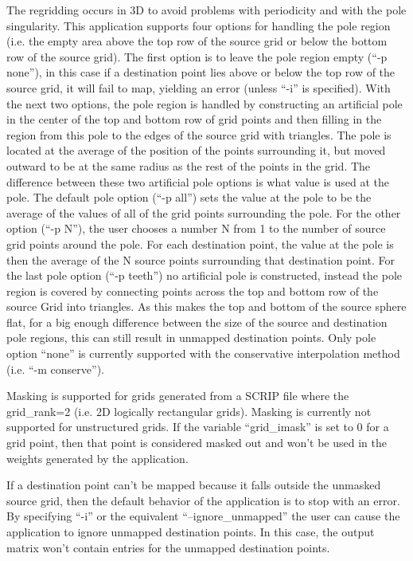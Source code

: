 The regridding occurs in 3D to avoid
problems with periodicity and with the pole singularity. This application
supports four options for handling the pole region (i.e. the empty area above the top row of the source grid or below
the bottom row of the source grid).  The first option is to leave the pole region empty (``-p none''), in this 
case if a destination point lies above or below the 
top row of the source grid, it will fail to map, yielding an error (unless ``-i'' is specified).  
With the next two options, the pole region is handled by constructing 
an artificial pole in the center of the top and bottom row of grid points and then filling
in the region from this pole to the edges of the source grid with triangles. 
The pole is located at the average of the position of the points surrounding
it, but moved outward to be at the same radius as the rest of the points
in the grid. The difference between these two artificial pole options is what value is used at the pole. 
The default pole option (``-p all'') sets the value at the pole to be the average of the values
of all of the grid points surrounding the pole. For the other option (``-p N''), the user chooses
a number N from 1 to the number of source grid points around the pole. For
each destination point, the value at the pole is then the average of the N source points
surrounding that destination point. For the last pole option (``-p teeth'') no artificial pole is constructed, instead the
pole region is covered by connecting points across the top and bottom row of the source Grid into triangles. As 
this makes the top and bottom of the source sphere flat, for a big enough difference between the size of
the source and destination pole regions, this can still result in unmapped destination points.  
Only pole option ``none'' is currently supported with the conservative interpolation method (i.e. ``-m conserve''). 

Masking is supported for grids generated from a SCRIP file where the grid\_rank=2 (i.e. 2D logically rectangular grids). Masking is currently not supported for 
unstructured grids. If the variable ``grid\_imask'' is set to 0 for a grid point, then that point is considered masked out and won't be used in the weights generated by
the application.

If a destination point can't be mapped because it falls outside the unmasked source grid, then the default behavior of the application is to stop with an error. By specifying ``-i'' or the equivalent ``--ignore\_unmapped'' the user can cause the application to ignore unmapped destination points. In this case, the output matrix won't contain entries for the unmapped destination points. 

